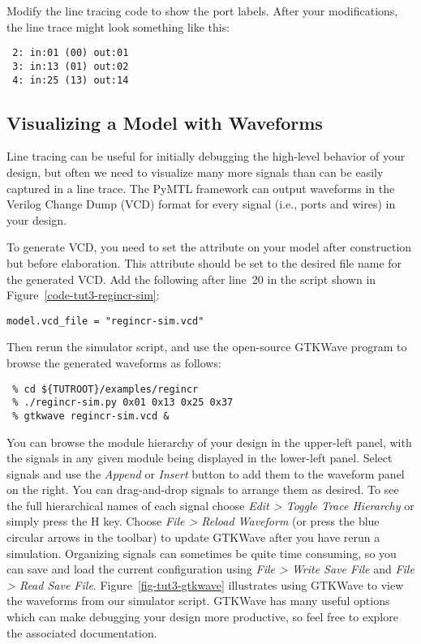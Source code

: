 \documentclass{cbxdoc}
\begin{document}
\begin{task}
  Modify the line tracing code to show the port labels. After your
  modifications, the line trace might look something like this:

  \begin{verbatim}
 2: in:01 (00) out:01
 3: in:13 (01) out:02
 4: in:25 (13) out:14
  \end{verbatim}
  \vspace{-0.15in}
\end{task}

\subsection{Visualizing a Model with Waveforms}

Line tracing can be useful for initially debugging the high-level
behavior of your design, but often we need to visualize many more signals
than can be easily captured in a line trace. The PyMTL framework can
output waveforms in the Verilog Change Dump (VCD) format for every signal
(i.e., ports and wires) in your design.

To generate VCD, you need to set the  attribute on your
model after construction but before elaboration. This attribute should be
set to the desired file name for the generated VCD. Add the following
after line~20 in the  script shown in
Figure~\ref{code-tut3-regincr-sim}:

\vspace{0.05in}
\begin{lstlisting}[numbers={none},basicstyle={\ttfamily},xleftmargin={0.1in}]
model.vcd_file = "regincr-sim.vcd"
\end{lstlisting}
\vspace{-0.05in}

Then rerun the simulator script, and use the open-source GTKWave program
to browse the generated waveforms as follows:

\begin{verbatim}
 % cd ${TUTROOT}/examples/regincr
 % ./regincr-sim.py 0x01 0x13 0x25 0x37
 % gtkwave regincr-sim.vcd &
\end{verbatim}

You can browse the module hierarchy of your design in the upper-left
panel, with the signals in any given module being displayed in the
lower-left panel. Select signals and use the \emph{Append} or
\emph{Insert} button to add them to the waveform panel on the right. You
can drag-and-drop signals to arrange them as desired. To see the full
hierarchical names of each signal choose \emph{Edit > Toggle Trace
  Hierarchy} or simply press the H key. Choose \emph{File > Reload
  Waveform} (or press the blue circular arrows in the toolbar) to update
GTKWave after you have rerun a simulation. Organizing signals can
sometimes be quite time consuming, so you can save and load the current
configuration using \emph{File > Write Save File} and \emph{File > Read
  Save File}. Figure~\ref{fig-tut3-gtkwave} illustrates using GTKWave to
view the waveforms from our simulator script. GTKWave has many useful
options which can make debugging your design more productive, so feel
free to explore the associated documentation.
\end{document}
